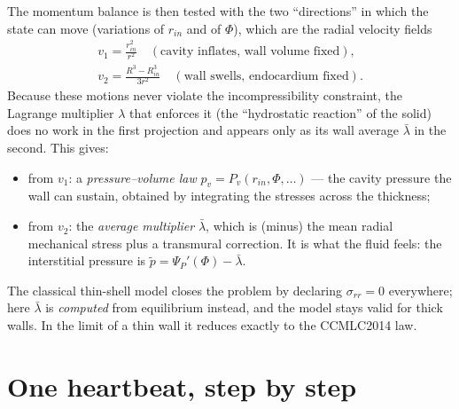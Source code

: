 \documentclass[11pt,a4paper]{article}
\newcommand{\Rin}{R_{in}}
\newcommand{\rin}{r_{in}}
\newcommand{\lb}{\bar\lambda}
\newcommand{\pf}{\tilde p}
\begin{document}
The momentum balance is then tested with the two ``directions'' in which the state can move (variations of $\rin$ and of $\Phi$), which are the radial velocity fields
\begin{gather*}
v_1=\frac{\rin^2}{r^2}\quad(\text{cavity inflates, wall volume fixed}),\\
v_2=\frac{R^3-\Rin^3}{3r^2}\quad(\text{wall swells, endocardium fixed}).
\end{gather*}
Because these motions never violate the incompressibility constraint, the Lagrange multiplier $\lambda$ that enforces it (the ``hydrostatic reaction'' of the solid) does no work in the first projection and appears only as its wall average $\lb$ in the second. This gives:
\begin{itemize}[leftmargin=2em]
\item from $v_1$: a \emph{pressure--volume law} $p_v=P_v(\rin,\Phi,\dots)$ --- the cavity pressure the wall can sustain, obtained by integrating the stresses across the thickness;
\item from $v_2$: the \emph{average multiplier} $\lb$, which is (minus) the mean radial mechanical stress plus a transmural correction. It is what the fluid feels: the interstitial pressure is $\pf=\Psi_P'(\Phi)-\lb$.
\end{itemize}
The classical thin-shell model closes the problem by declaring $\sigma_{rr}=0$ everywhere; here $\lb$ is \emph{computed} from equilibrium instead, and the model stays valid for thick walls. In the limit of a thin wall it reduces exactly to the CCMLC2014 law.

\section{One heartbeat, step by step}
\end{document}
